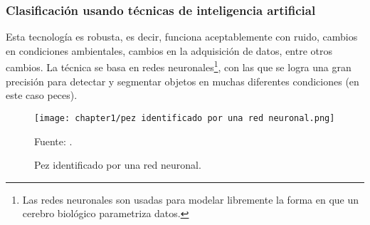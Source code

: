 \subsubsection{Clasificación usando técnicas de inteligencia artificial}

Esta tecnología es robusta, es decir, funciona aceptablemente con ruido, cambios en condiciones ambientales, cambios en la adquisición de datos, entre otros cambios. La técnica se basa en redes neuronales\footnote{Las redes neuronales son usadas para modelar libremente la forma en que un cerebro biológico parametriza datos.}, con las que se logra una gran precisión para detectar y segmentar objetos en muchas diferentes condiciones (en este caso peces).\\

\begin{figure}[H]
	\centering
	\texttt{[image: chapter1/pez identificado por una red neuronal.png]}
	\caption{Pez identificado por una red neuronal.}
	\begin{myflushleftportland}
		Fuente: \citep{Varalakshmi2019}.
	\end{myflushleftportland}	
	\label{fig:pez identificado por una red neuronal}
\end{figure}




